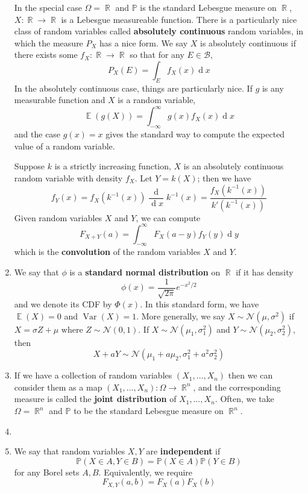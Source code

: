 \documentclass[12pt, a4paper]{article}
\DeclareMathOperator{\R}{\mathbb{R}}
\DeclareMathOperator{\E}{\mathbb{E}}
\DeclareMathOperator{\Var}{Var}
\renewcommand{\Pr}{\mathbb{P}}
\renewcommand{\d}[1]{\ensuremath{\operatorname{d}\!{#1}}} %
\theoremstyle{nonumberplain}
\begin{document}
\begin{enumerate}
        In the special case $\Omega=\R$ and $\Pr$ is the standard Lebesgue measure on $\R$, $X:\R\to\R$ is a Lebesgue measureable function.
        There is a particularly nice class of random variables called \textbf{absolutely continuous} random variables, in which the measure $P_X$ has a nice form.
        We say $X$ is absolutely continuous if there exists some $f_X:\R\to\R$ so that for any $E\in\mathcal{B}$,
        \[P_X(E)=\int_E f_X(x)\d{x}\]
        In the absolutely continuous case, things are particularly nice.
        If $g$ is any measurable function and $X$ is a random variable,
        \[\E(g(X))=\int_{-\infty}^\infty g(x)f_X(x)\d{x}\]
        and the case $g(x)=x$ gives the standard way to compute the expected value of a random variable.

        Suppose $k$ is a strictly increasing function, $X$ is an absolutely continuous random variable with density $f_X$.
        Let $Y=k(X)$; then we have
        \begin{equation*} f_Y(x) = f_X(k^{-1}(x))\frac{\d{}}{\d{x}}k^{-1}(x)=\frac{f_X(k^{-1}(x))}{k'(k^{-1}(x))}\end{equation*}
        Given random variables $X$ and $Y$, we can compute
        \[F_{X+Y}(a)=\int_{-\infty}^\infty F_X(a-y)f_Y(y)\d{y}\]
        which is the \textbf{convolution} of the random variables $X$ and $Y$.
    \item We say that $\phi$ is a \textbf{standard normal distribution} on $\R$ if it has density
        \[\phi(x)=\frac{1}{\sqrt{2\pi}}e^{-x^2/2}\]
        and we denote its CDF by $\Phi(x)$.
        In this standard form, we have $\E(X)=0$ and $\Var(X)=1$.
        More generally, we say $X\sim\mathcal{N}(\mu,\sigma^2)$ if $X=\sigma Z+\mu$ where $Z\sim\mathcal{N}(0,1)$.
        If $X\sim\mathcal{N}(\mu_1,\sigma_1^2)$ and $Y\sim\mathcal{N}(\mu_2,\sigma_2^2)$, then
        \[X+aY\sim\mathcal{N}(\mu_1+a\mu_2,\sigma_1^2+a^2\sigma_2^2)\]

    \item If we have a collection of random variables $(X_1,\ldots,X_n)$ then we can consider them as a map $(X_1,\ldots,X_n):\Omega\to\R^n$, and the corresponding measure is called the \textbf{joint distribution} of $X_1,\ldots,X_n$.
        Often, we take $\Omega=\R^n$ and $\Pr$ to be the standard Lebesgue measure on $\R^n$.
    \item 
    \item We say that random variables $X,Y$ are \textbf{independent} if
        \[\Pr(X\in A,Y\in B)=\Pr(X\in A)\Pr(Y\in B)\]
        for any Borel sets $A,B$.
        Equivalently, we require
        \[F_{X,Y}(a,b)=F_X(a)F_X(b)\]
\end{enumerate}
\end{document}
